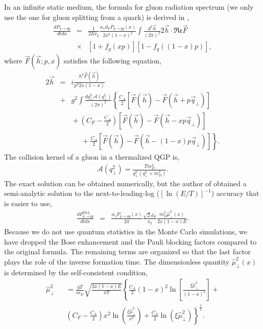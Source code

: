 \documentclass[aps, prc, reprint, amsmath, groupedaddress, nofootinbib]{revtex4-1}
\begin{document}
In an infinite static medium, the formula for gluon radiation spectrum (we only use the one for gluon splitting from a quark) is derived in \cite{Arnold:2002zm,Arnold:2003zc},
\begin{eqnarray}\label{eq:AMY-1}
\nonumber
\frac{dP_{q\rightarrow qg}}{dt dx} &=& \frac{1}{2E\nu_q} \frac{\alpha_s d_F P_{q\rightarrow qg}(x)}{2x^2(1-x)^2}\int\frac{d^2\vec{h}}{(2\pi)^2}2\vec{h}\cdot \mathfrak{Re} \vec{F} \\
&\times& [1+f_g(xp)][1-f_q((1-x)p)],
\end{eqnarray}
where $\vec{F}(\vec{h}; p, x)$ satisfies the following equation,
\begin{eqnarray}\label{eq:AMY-2}
\nonumber
2\vec{h} &=& i\frac{h^2 \vec{F}(\vec{h})}{p^3 2x(1-x)} \\
\nonumber
&+& g^2\int \frac{dq_\perp^2 \mathcal{A}(q_\perp^2)}{(2\pi)^2}\left\{\frac{C_A}{2}\left[\vec{F}(\vec{h}) - \vec{F}(\vec{h}+p\vec{q}_\perp)\right]\right. \\
\nonumber
&& \phantom{} + \left(C_F - \frac{C_A}{2}\right)\left[\vec{F}(\vec{h}) - \vec{F}(\vec{h}-xp\vec{q}_\perp)\right] \\
&& \phantom{sss} + \left. \frac{C_A}{2}\left[\vec{F}(\vec{h}) - \vec{F}(\vec{h}-(1-x)p\vec{q}_\perp)\right] \right\}.
\end{eqnarray}
The collision kernel of a gluon in a thermalized QGP is,
\begin{eqnarray}
\mathcal{A}(q_\perp^2) = \frac{T m_D^2}{q_\perp^2(q_\perp^2+m_D^2)}.
\end{eqnarray}
The exact solution can be obtained numerically, but the author of \cite{Arnold:2008zu} obtained a semi-analytic solution to the next-to-leading-log ($[\ln(E/T)]^{-1}$) accuracy that is easier to use,
\begin{eqnarray}\label{eq:AMY-NLL}
\frac{dP_{q\rightarrow qg}^{\textrm{NLL}}}{dt dx} &=& \frac{\alpha_s P_{q\rightarrow qg}(x)}{2\pi}\frac{ \sqrt{2} d_F }{\nu_q }  \frac{m_D^2\hat{\mu}_\perp^2(x)}{2x(1-x)E}. 
\end{eqnarray}
Because we do not use quantum statistics in the Monte Carlo simulations, we have dropped the Bose enhancement and the Pauli blocking factors compared to the original formula.
The remaining terms are organized so that the last factor plays the role of the inverse formation time.
The dimensionless quantity $\hat{\mu}_\perp^2(x)$ is determined by the self-consistent condition,
\begin{eqnarray}\label{eq:AMY-sf}
\nonumber
\hat{\mu}_\perp^2 && = \frac{gT}{m_D} \sqrt{\frac{2x(1-x)E}{\pi T}}\left\{
\frac{C_A}{2}(1-x)^2\ln\left[\frac{\xi\hat{\mu}_\perp^2}{(1-x)^2}\right] + \right. \\
&&\left.\left(C_F-\frac{C_A}{2}\right)x^2\ln\left(\frac{\xi\hat{\mu}_\perp^2}{x^2}\right) + \frac{C_A}{2}\ln(\xi\hat{\mu}_\perp^2)\right\}^{\frac{1}{2}}.
\end{eqnarray}
\end{document}
